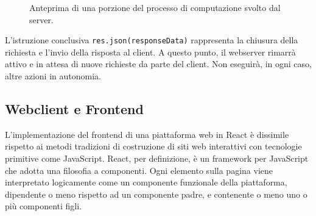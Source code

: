 \begin{figure}[ht!]
    \centering
    \caption{Anteprima di una porzione del processo di computazione svolto dal server.}
    \label{fig:esempio}
\end{figure}


L'istruzione conclusiva \verb|res.json(responseData)| rappresenta la chiusura della richiesta e l'invio della risposta al client. A questo punto, il webserver rimarrà attivo e in attesa di nuove richieste da parte del client. Non eseguirà, in ogni caso, altre azioni in autonomia.

\subsection{Webclient e Frontend}

L'implementazione del frontend di una piattaforma web in React è dissimile rispetto ai metodi tradizioni di costruzione di siti web interattivi con tecnologie primitive come JavaScript. React, per definizione, è un framework per JavaScript che adotta una filosofia a componenti. Ogni elemento sulla pagina viene interpretato logicamente come un componente funzionale della piattaforma, dipendente o meno rispetto ad un componente padre, e contenente o meno uno o più componenti figli. 

